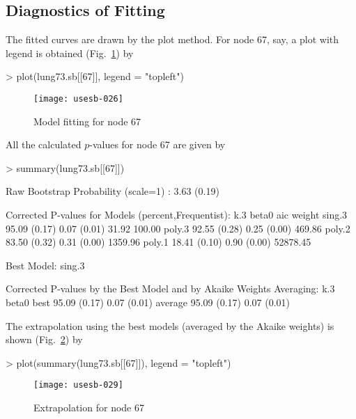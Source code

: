 \documentclass[a4paper]{amsart}
\begin{document}
\subsection{Diagnostics of Fitting}

The fitted curves are drawn by the plot method. For node 67, say, a
plot with legend is obtained (Fig.~\ref{fig:lungplot67}) by
\begin{Schunk}
\begin{Sinput}
> plot(lung73.sb[[67]], legend = "topleft")
\end{Sinput}
\end{Schunk}
\begin{figure}
\begin{center}
\texttt{[image: usesb-026]}
\caption{Model fitting for node 67}\label{fig:lungplot67}
\end{center}
\end{figure}
All the calculated $p$-values for node 67 are given by
\begin{Schunk}
\begin{Sinput}
> summary(lung73.sb[[67]])
\end{Sinput}
\begin{Soutput}
Raw Bootstrap Probability (scale=1) : 3.63 (0.19)

Corrected P-values for Models (percent,Frequentist):
       k.3          beta0       aic      weight 
sing.3 95.09 (0.17) 0.07 (0.01)    31.92 100.00 
poly.3 92.55 (0.28) 0.25 (0.00)   469.86        
poly.2 83.50 (0.32) 0.31 (0.00)  1359.96        
poly.1 18.41 (0.10) 0.90 (0.00) 52878.45        

Best Model:  sing.3 

Corrected P-values by the Best Model and by Akaike Weights Averaging:
        k.3          beta0       
best    95.09 (0.17) 0.07 (0.01) 
average 95.09 (0.17) 0.07 (0.01) 
\end{Soutput}
\end{Schunk}
The extrapolation using the best models (averaged by the Akaike
weights) is shown (Fig.~\ref{fig:lungext67}) by
\begin{Schunk}
\begin{Sinput}
> plot(summary(lung73.sb[[67]]), legend = "topleft")
\end{Sinput}
\end{Schunk}
\begin{figure}
\begin{center}
\texttt{[image: usesb-029]}
\caption{Extrapolation for node 67}\label{fig:lungext67}
\end{center}
\end{figure}
\end{document}
